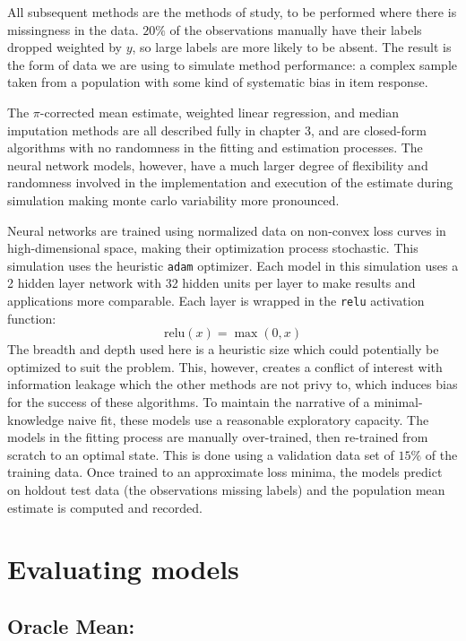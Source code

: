 \documentclass[12pt,twoside]{reedthesis}
\begin{document}
All subsequent methods are the methods of study, to be performed where
there is missingness in the data. \(20\%\) of the observations manually
have their labels dropped weighted by \(y\), so large labels are more
likely to be absent. The result is the form of data we are using to
simulate method performance: a complex sample taken from a population
with some kind of systematic bias in item response.

The \(\pi\)-corrected mean estimate, weighted linear regression, and
median imputation methods are all described fully in chapter 3, and are
closed-form algorithms with no randomness in the fitting and estimation
processes. The neural network models, however, have a much larger degree
of flexibility and randomness involved in the implementation and
execution of the estimate during simulation making monte carlo
variability more pronounced.

Neural networks are trained using normalized data on non-convex loss
curves in high-dimensional space, making their optimization process
stochastic. This simulation uses the heuristic \texttt{adam} optimizer.
Each model in this simulation uses a 2 hidden layer network with 32
hidden units per layer to make results and applications more comparable.
Each layer is wrapped in the \texttt{relu} activation function: \[
\text{relu}(x) = \max(0,x)
\] The breadth and depth used here is a heuristic size which could
potentially be optimized to suit the problem. This, however, creates a
conflict of interest with information leakage which the other methods
are not privy to, which induces bias for the success of these
algorithms. To maintain the narrative of a minimal-knowledge naive fit,
these models use a reasonable exploratory capacity. The models in the
fitting process are manually over-trained, then re-trained from scratch
to an optimal state. This is done using a validation data set of
\(15\%\) of the training data. Once trained to an approximate loss
minima, the models predict on holdout test data (the observations
missing labels) and the population mean estimate is computed and
recorded.

\section{Evaluating models}\label{evaluating-models}

\subsection{Oracle Mean:}\label{oracle-mean}
\end{document}
